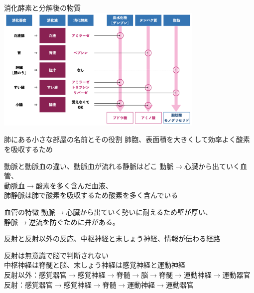 \documentclass[10pt,dvipdfmx]{jsarticle}
\newcommand{\answer}[2]{{\color{orange}#2}}
\newcommand{\answer}[2]{\vspace{#1mm}}
\begin{document}
\begin{itembox}[l]{消化酵素と分解後の物質}
	\answer{20}{
		\includegraphics[width=10cm]{science_figure/syoka.pdf}
	}
\end{itembox}

\begin{itembox}[l]{肺にある小さな部屋の名前とその役割}
	\answer{10}{肺胞、表面積を大きくして効率よく酸素を吸収するため}
\end{itembox}

\begin{itembox}[l]{動脈と動脈血の違い、動脈血が流れる静脈はどこ}
	\answer{10}{
		動脈$\rightarrow$心臓から出ていく血管、\\
		動脈血$\rightarrow$酸素を多く含んだ血液、\\
		肺静脈は肺で酸素を吸収するため酸素を多く含んでいる\\
	}
\end{itembox}

\begin{itembox}[l]{血管の特徴}
	\answer{8}{
		動脈$\rightarrow$心臓から出ていく勢いに耐えるため壁が厚い、\\
		静脈$\rightarrow$逆流を防ぐために弁がある。
	}
\end{itembox}

\begin{itembox}[l]{反射と反射以外の反応、中枢神経と末しょう神経、情報が伝わる経路}
	\answer{15}{
		反射は無意識で脳で判断されない\\
		中枢神経は脊髄と脳、末しょう神経は感覚神経と運動神経\\
		反射以外：感覚器官$\rightarrow$感覚神経$\rightarrow$脊髄$\rightarrow$脳$\rightarrow$脊髄$\rightarrow$運動神経$\rightarrow$運動器官\\
		反射：感覚器官$\rightarrow$感覚神経$\rightarrow$脊髄$\rightarrow$運動神経$\rightarrow$運動器官

	}
\end{itembox}
\end{document}
